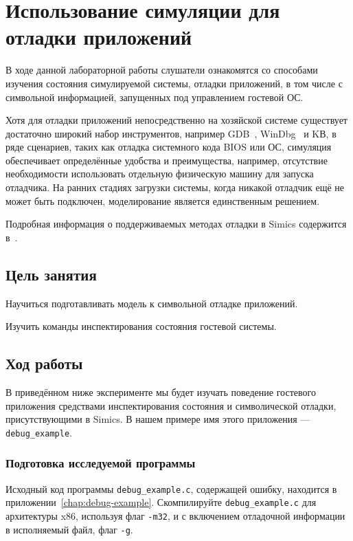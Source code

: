 \chapter{Использование симуляции для отладки приложений}\label{chap:lab04}

В ходе данной лабораторной работы слушатели ознакомятся со способами изучения состояния симулируемой системы, отладки приложений, в том числе с символьной информацией, запущенных под управлением гостевой ОС.

Хотя для отладки приложений непосредственно на хозяйской системе существует достаточно широкий набор инструментов, например GDB~\cite{gdb}, WinDbg~\cite{windbg} и KВ, в ряде сценариев, таких как отладка системного кода BIOS или ОС, симуляция обеспечивает определённые удобства и преимущества, например, отсутствие необходимости использовать отдельную физическую машину для запуска отладчика. На ранних стадиях загрузки системы, когда никакой отладчик ещё не может быть подключен, моделирование является единственным решением.

Подробная информация о поддерживаемых методах отладки в Simics содержится в~\cite{analyzer, hindsight}.

\section{Цель занятия}

\begin{itemize*}
    \item Научиться подготавливать модель к символьной отладке приложений.
    \item Изучить команды инспектирования состояния гостевой системы.
\end{itemize*}

\section{Ход работы}

В приведённом ниже эксперименте мы будет изучать поведение гостевого приложения средствами инспектирования состояния и символической отладки, присутствующими в Simics. В нашем примере имя этого приложения --- \texttt{debug_example}.

\subsection{Подготовка исследуемой программы}

Исходный код программы \texttt{debug_example.c}, содержащей ошибку, находится в приложении~\ref{chap:debug-example}. Скомпилируйте \texttt{debug_example.c} для архитектуры x86, используя флаг \texttt{-m32}, и с включением отладочной информации в исполняемый файл, флаг \texttt{-g}.

